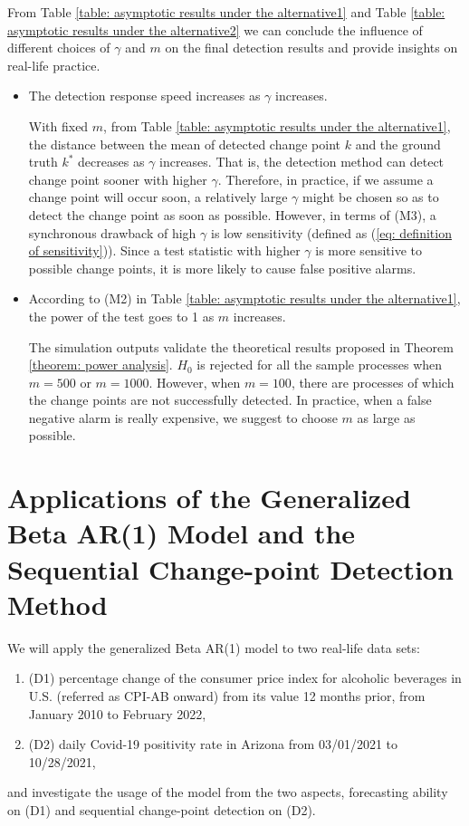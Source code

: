\documentclass{article}
\theoremstyle{definition}
\begin{document}
From Table \ref{table: asymptotic results under the alternative1} and Table \ref{table: asymptotic results under the alternative2} we can conclude the influence of different choices of $\gamma$ and $m$ on the final detection results and provide insights on real-life practice.
\begin{itemize}
    \item The detection response speed increases as $\gamma$ increases. 
    
    With fixed $m$, from Table \ref{table: asymptotic results under the alternative1}, the distance between the mean of detected change point $k$ and the ground truth $k^*$ decreases as $\gamma$ increases. That is, the detection method can detect change point sooner with higher $\gamma$. Therefore, in practice, if we assume a change point will occur soon, a relatively large $\gamma$ might be chosen so as to detect the change point as soon as possible. However, in terms of (M3), a synchronous drawback of high $\gamma$ is low sensitivity (defined as (\ref{eq: definition of sensitivity})). Since a test statistic with higher $\gamma$ is more sensitive to possible change points, it is more likely to cause false positive alarms.
    
    \item According to (M2) in Table \ref{table: asymptotic results under the alternative1}, the power of the test goes to 1 as $m$ increases.
    
    The simulation outputs validate the theoretical results proposed in Theorem \ref{theorem: power analysis}. $H_0$ is rejected for all the sample processes when $m = 500$ or $m = 1000$. However, when $m = 100$, there are processes of which the change points are not successfully detected. In practice, when a false negative alarm is really expensive, we suggest to choose $m$ as large as possible.
\end{itemize}

\section{Applications of the Generalized Beta AR(1) Model and the Sequential Change-point Detection Method} 
\label{sec: real life data}
We will apply the generalized Beta AR(1) model to two real-life data sets: 
\begin{enumerate}
    \item (D1) percentage change of the consumer price index for alcoholic beverages in U.S. (referred as CPI-AB onward) from its value 12 months prior, from January 2010 to February 2022,
    \item (D2) daily Covid-19 positivity rate in Arizona from 03/01/2021 to 10/28/2021,
\end{enumerate} and investigate the usage of the model from the two aspects, forecasting ability on (D1) and sequential change-point detection on (D2). 
\end{document}

